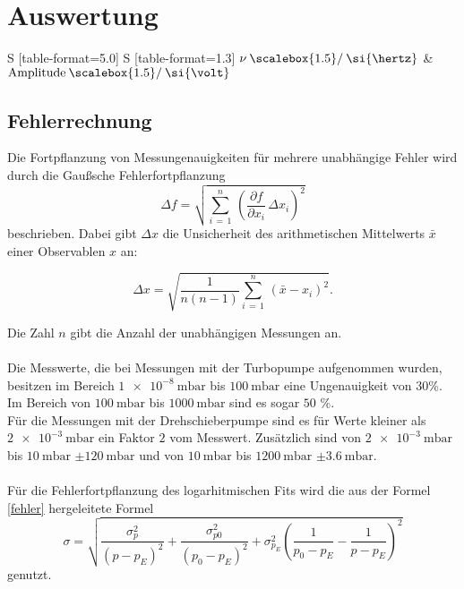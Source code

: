 \newpage 
\section{Auswertung}

        \begin{table}[ht]
          \centering
          \small
          \caption{Messdaten zur Wien-Robinson-Brücke}
          \label{tab:tab2}
          \begin{tabular}{S [table-format=5.0] S [table-format=1.3]}
           \toprule
           {$\nu \mathbin{\scalebox{1.5} / } \si{\hertz}$} & $\text{Amplitude} \mathbin{\scalebox{1.5} / } \si{\volt}$\\
           \midrule
          \bottomrule
          \end{tabular}
        \end{table} 




        \subsection{Fehlerrechnung}
        \noindent
        Die Fortpflanzung von Messungenauigkeiten für mehrere unabhängige Fehler wird durch die Gaußsche Fehlerfortpflanzung
        \begin{equation*}
        \Delta f = \sqrt{\sum_{i \, = \, 1}^{n} \, \left(\frac{\partial f}{\partial x_i} \, \Delta x_i\right)^2}
        \label{fehler}
        \end{equation*}
        beschrieben. Dabei gibt $\Delta x$ die Unsicherheit des arithmetischen Mittelwerts $\bar{x}$ einer Observablen $x$ an:
        
        \begin{equation*}
        \Delta x =  \sqrt{\frac{1}{n(n-1)} \sum_{i \, = \, 1}^{n} \, \left(\bar{x}- x_i\right)^2}.
        \end{equation*}

        \noindent
        Die Zahl $n$ gibt die Anzahl der unabhängigen Messungen an.\\\\
        Die Messwerte, die bei Messungen mit der Turbopumpe aufgenommen wurden, besitzen im Bereich $\SI{1e-8}{\milli\bar}$ bis $\SI{100}{\milli\bar}$ eine Ungenauigkeit von $30$\%.
        Im Bereich von $\SI{100}{\milli\bar}$ bis $\SI{1000}{\milli\bar}$ sind es sogar $50$ \%.\\
        Für die Messungen mit der Drehschieberpumpe sind es für Werte kleiner als $\SI{2e-3}{\milli\bar}$ ein Faktor $2$ vom Messwert.
        Zusätzlich sind von $\SI{2e-3}{\milli\bar}$ bis $\SI{10}{\milli\bar}$ $\pm \SI{120}{\milli\bar}$ und von $\SI{10}{\milli\bar}$ bis $\SI{1200}{\milli\bar}$ $\pm \SI{3.6}{\milli\bar}$.\\\\
        Für die Fehlerfortpflanzung des logarhitmischen Fits wird die aus der Formel \ref*{fehler} hergeleitete Formel 
        \begin{equation*}
          \sigma = \sqrt{\frac{\sigma_p^2}{(p-p_E)^2}+\frac{\sigma_{p0}^2}{(p_0-p_E)^2}+\sigma_{p_E}^2 \left(\frac{1}{p_0-p_E}-\frac{1}{p-p_E}\right)^2}
        \end{equation*}
        genutzt.


